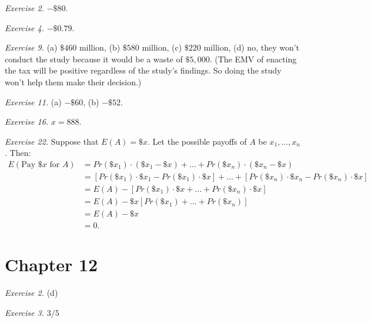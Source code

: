 \documentclass[justified]{tufte-book}
\newcommand{\p}{Pr}
\theoremstyle{definition}
\theoremstyle{definition}
\theoremstyle{definition}
\theoremstyle{definition}
\theoremstyle{remark}
\begin{document}
\noindent
\emph{Exercise 2.} \(-\$80\).

\vspace{.5em}

\noindent
\emph{Exercise 4.} \(-\$0.79\).

\vspace{.5em}

\noindent
\emph{Exercise 9.} (a) \(\$460\) million, (b) \(\$580\) million, (c) \(\$220\) million, (d) no, they won't conduct the study because it would be a waste of \(\$5,000\). (The EMV of enacting the tax will be positive regardless of the study's findings. So doing the study won't help them make their decision.)

\vspace{.5em}

\noindent
\emph{Exercise 11.} (a) \(-\$60\), (b) \(-\$52\).

\vspace{.5em}

\noindent
\emph{Exercise 16.} \(x = 888\).

\vspace{.5em}

\noindent
\emph{Exercise 22.} Suppose that \(E(A) = \$x\). Let the possible payoffs of \(A\) be \(x_1, \ldots, x_n\). Then:
\[
  \begin{aligned}
    E(\text{Pay $\$x$ for $A$})
      &= \p(\$x_1) \cdot (\$x_1 - \$x) + \ldots + \p(\$x_n) \cdot (\$x_n - \$x)\\
      &= \left[\p(\$x_1) \cdot \$ x_1 - \p(\$x_1) \cdot \$x \right] + \ldots + \left[\p(\$x_n) \cdot \$x_n - \p(\$x_n) \cdot \$x \right]\\
      &= E(A) - \left[\p(\$x_1) \cdot \$ x + \ldots + \p(\$x_n) \cdot \$x \right]\\
      &= E(A) - \$x \left[\p(\$x_1) + \ldots + \p(\$x_n) \right]\\
      &= E(A) - \$x \\
      &= 0.
  \end{aligned}
  \]

\hypertarget{chapter-12}{%
\section*{Chapter 12}\label{chapter-12}}

\noindent
\emph{Exercise 2.} (d)

\vspace{.5em}

\noindent
\emph{Exercise 3.} \(3/5\)
\end{document}
